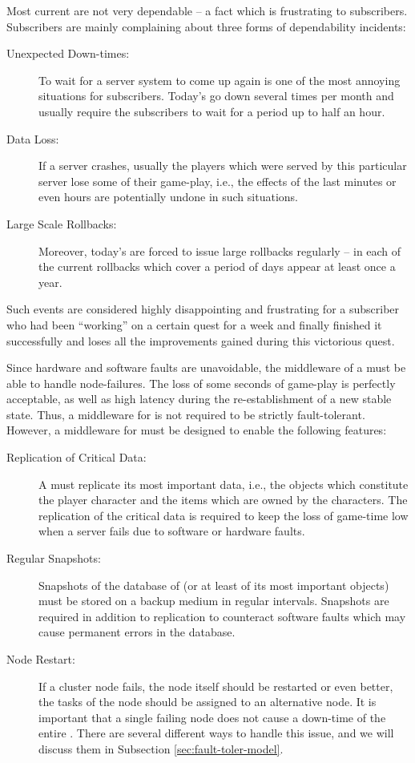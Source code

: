 \documentclass[a4paper, 10pt]{book}
\begin{document}
Most current \MMORGS are not very dependable -- a fact which
is frustrating to subscribers. Subscribers are mainly complaining
about three forms of dependability incidents:
\begin{description}
    \item[Unexpected Down-times:] To wait for a server system to come up
        again is one of the most annoying situations for subscribers.
        Today's \MMORGS go down several times per month and usually require
        the subscribers to wait for a period up to half an hour.
    \item[Data Loss:] If a server crashes, usually the players which were
        served by this particular server lose some of their game-play, i.e.,
        the effects of the last minutes or even hours are potentially undone
        in such situations. 
    \item[Large Scale Rollbacks:] Moreover, today's \MMORGS are forced to
        issue large rollbacks regularly -- in each of the current \MMORGS
        rollbacks which cover a period of days appear at least once a year.
\end{description}
Such events are considered highly disappointing and frustrating for
a subscriber who had been ``working'' on a certain quest for a week
and finally finished it successfully and loses all the improvements
gained during this victorious quest.
%

%
%
Since hardware and software faults are unavoidable, the middleware of
a \MMORG must be able to handle node-failures. The loss of some
seconds of game-play is perfectly acceptable, as well as high latency
during the re-establishment of a new stable state. Thus, a middleware
for \MMORG is not required to be strictly fault-tolerant. However, a
middleware for \MMORGS must be designed to enable the following
features:
\begin{description}
    \item[Replication of Critical Data:] A \MMORG must replicate its most
        important data, i.e., the objects which constitute the player
        character and the items which are owned by the characters. The
        replication of the critical data is required to keep the loss of
        game-time low when a server fails due to software or hardware
        faults. 
    \item[Regular Snapshots:] Snapshots of the database of \MMORG (or at
        least of its most important objects) must be stored on a backup
        medium in regular intervals. Snapshots are required in addition to
        replication to counteract software faults which may cause permanent
        errors in the database. 
    \item[Node Restart:] If a cluster node fails, the node itself should be
        restarted or even better, the tasks of the node should be assigned
        to an alternative node. It is important that a single failing node
        does not cause a down-time of the entire \MMORG. There are several
        different ways to handle this issue, and we will discuss them in
        Subsection \vref{sec:fault-toler-model}.
\end{description}
%
\end{document}
